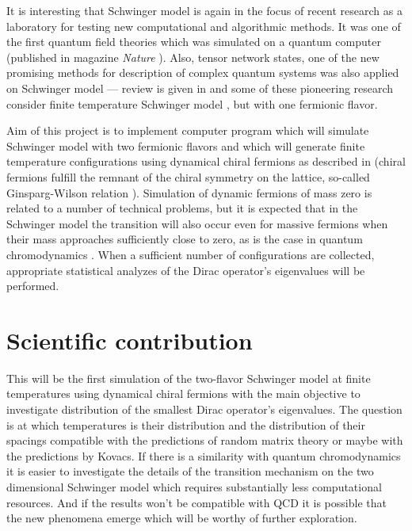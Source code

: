 \documentclass[12pt,a4paper]{article}
\begin{document}
It is interesting that Schwinger model is again in the focus of recent research as a laboratory for testing new computational and algorithmic methods. It was one of the first quantum field theories which was simulated on a quantum computer (published in magazine \textit{Nature} \cite{Martinez:16}). Also, tensor network states, one of the new promising methods for description of complex quantum systems was also applied on Schwinger model --- review is given in \cite{Banuls:18} and some of these pioneering research consider finite temperature Schwinger model \cite{Banuls:15, Buyens:16}, but with one fermionic flavor.

Aim of this project is to implement computer program which will simulate Schwinger model with two fermionic flavors and  which will generate finite temperature configurations using dynamical chiral fermions as described in \cite{Bietenholz:11} (chiral fermions fulfill the remnant of the chiral symmetry on the lattice, so-called Ginsparg-Wilson relation \cite{Ginsparg:81}). Simulation of dynamic fermions of mass zero is related to a number of technical problems, but it is expected that in the Schwinger model the transition will also occur even for massive fermions when their mass approaches sufficiently close to zero, as is the case in quantum chromodynamics \cite{Kovacs:12}. When a sufficient number of configurations are collected, appropriate statistical analyzes of the Dirac operator's eigenvalues will be performed.

 
\section{Scientific contribution}

This will be the first simulation of the two-flavor Schwinger model at finite temperatures using dynamical chiral fermions with the main objective to investigate distribution of the smallest Dirac operator's eigenvalues. The question is at which temperatures is their distribution and the distribution of their spacings compatible with the predictions of random matrix theory or maybe with the predictions by Kovacs. If there is a similarity with quantum chromodynamics it is easier to investigate the details of the transition mechanism on the two dimensional Schwinger model which requires substantially less computational resources. And if the results won't be compatible with QCD it is possible that the new phenomena emerge which will be worthy of further exploration.
\end{document}
